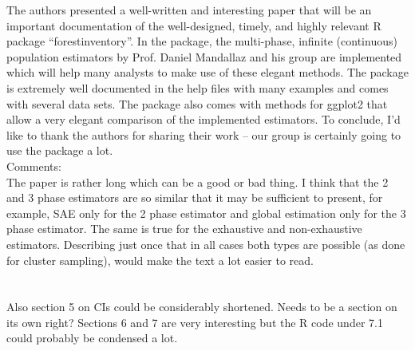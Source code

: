\documentclass{article}
\begin{document}
The authors presented a well-written and interesting paper that will be an important documentation of the well-designed, timely, and highly relevant R package “forestinventory”. In the package, the multi-phase, infinite
(continuous) population estimators by Prof. Daniel Mandallaz and his group are implemented which will help many analysts to make use of these elegant methods. The package is extremely well documented in the help files with many examples and comes with several data sets. The package also comes with methods for ggplot2 that allow a very elegant comparison of the implemented estimators. To conclude, I’d like to thank the authors for sharing their work -- our group is certainly going to use the package a lot.\\


Comments:\\

The paper is rather long which can be a good or bad thing. I think that the 2 and 3 phase estimators are so similar that it may be sufficient to present, for example, SAE only for the 2 phase estimator and global estimation only for the 3 phase estimator. The same is true for the exhaustive and non-exhaustive estimators. Describing just once that in all cases both types are possible (as done for cluster sampling), would make the text a lot easier to read. \\
\\
 \\

Also section 5 on CIs could be considerably shortened. Needs to be a section on its own right? Sections 6 and 7 are very interesting but the R code under 7.1 could probably be condensed a lot.\\
\\
 \\
\end{document}
